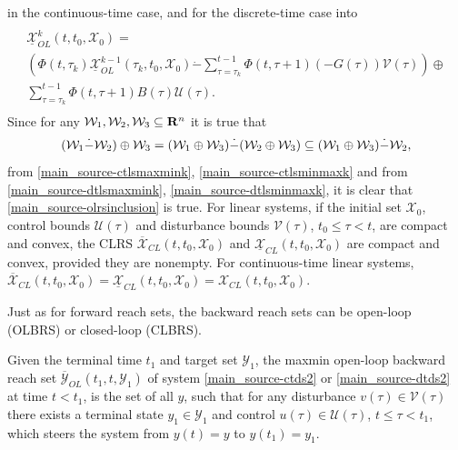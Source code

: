 \documentclass[letterpaper,10pt,english]{sphinxmanual}
\begin{document}
in the continuous-time case, and for the discrete-time case into
\label{main_source:equation-dtlsminmaxk}\begin{gather}
\begin{split}\begin{array}{l}
\underline{{\mathcal X}}_{OL}^k(t, t_0, {\mathcal X}_0) = \\
\left(\Phi(t, \tau_k)\underline{{\mathcal X}}_{OL}^{k-1}(\tau_k, t_0, {\mathcal X}_0) \dot{-}
\sum_{\tau=\tau_k}^{t-1}\Phi(t, \tau+1)(-G(\tau)){\mathcal V}(\tau)\right)
\oplus \\
\sum_{\tau=\tau_k}^{t-1}\Phi(t, \tau+1)B(\tau){\mathcal U}(\tau).
\end{array}\end{split}\label{main_source-dtlsminmaxk}
\end{gather}
Since for any
${\mathcal W}_1, {\mathcal W}_2, {\mathcal W}_3 \subseteq {\bf R}^n$
it is true that
\begin{gather}
\begin{split}({\mathcal W}_1 \dot{-} {\mathcal W}_2) \oplus {\mathcal W}_3 =
({\mathcal W}_1 \oplus {\mathcal W}_3) \dot{-} ({\mathcal W}_2 \oplus {\mathcal W}_3) \subseteq
({\mathcal W}_1 \oplus {\mathcal W}_3) \dot{-} {\mathcal W}_2,\end{split}\notag
\end{gather}
from \eqref{main_source-ctlsmaxmink}, \eqref{main_source-ctlsminmaxk} and from \eqref{main_source-dtlsmaxmink},
\eqref{main_source-dtlsminmaxk}, it is clear that \eqref{main_source-olrsinclusion} is true.
For linear systems, if the initial set ${\mathcal X}_0$, control
bounds ${\mathcal U}(\tau)$ and disturbance bounds
${\mathcal V}(\tau)$, $t_0\leqslant\tau<t$, are compact and
convex, the CLRS
$\overline{{\mathcal X}}_{CL}(t, t_0, {\mathcal X}_0)$ and
$\underline{{\mathcal X}}_{CL}(t, t_0, {\mathcal X}_0)$ are
compact and convex, provided they are nonempty. For continuous-time
linear systems,
$\overline{{\mathcal X}}_{CL}(t, t_0, {\mathcal X}_0) = \underline{{\mathcal X}}_{CL}(t, t_0, {\mathcal X}_0) = {\mathcal X}_{CL}(t, t_0, {\mathcal X}_0)$.

Just as for forward reach sets, the backward reach sets can be open-loop
(OLBRS) or closed-loop (CLBRS).

Given the terminal time $t_1$ and target set
${\mathcal Y}_1$, the maxmin open-loop backward reach set
$\overline{{\mathcal Y}}_{OL}(t_1, t, {\mathcal Y}_1)$ of system
\eqref{main_source-ctds2} or \eqref{main_source-dtds2} at time $t<t_1$, is the set of all $y$,
such that for any disturbance $v(\tau)\in{\mathcal V}(\tau)$ there
exists a terminal state $y_1\in{\mathcal Y}_1$ and control
$u(\tau)\in{\mathcal U}(\tau)$, $t\leqslant\tau<t_1$, which
steers the system from $y(t)=y$ to $y(t_1)=y_1$.
\end{document}
